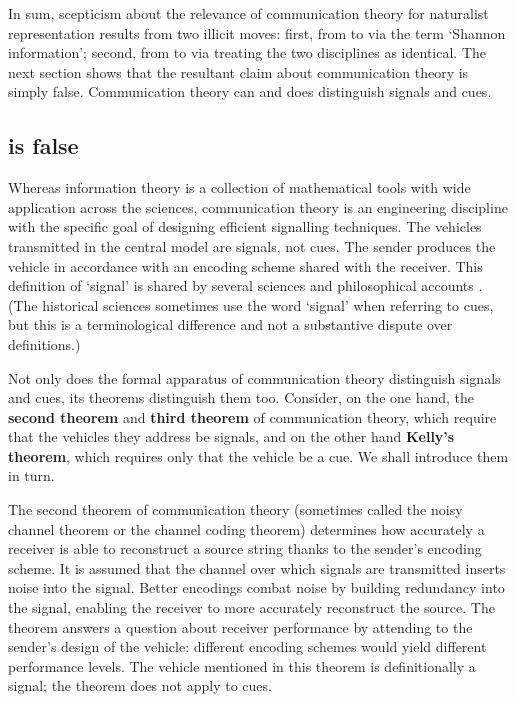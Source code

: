 In sum, scepticism about the relevance of communication theory for naturalist representation results from two illicit moves: first, from \ami{} to \ait{} via the term `Shannon information'; second, from \ait{} to \act{} via treating the two disciplines as identical.
The next section shows that the resultant claim about communication theory is simply false.
Communication theory can and does distinguish signals and cues.


\subsection{\act{} is false}

Whereas information theory is a collection of mathematical tools with wide application across the sciences, communication theory is an engineering discipline with the specific goal of designing efficient signalling techniques.
The vehicles transmitted in the central model are signals, not cues.
The sender produces the vehicle in accordance with an encoding scheme shared with the receiver.
This definition of `signal' is shared by several sciences \citep{shannon1948mathematicalc,maynardsmith2003animal} and philosophical accounts \citep[$\S$6]{millikan2004varieties} \citep{bergstrom2011transmission}.
(The historical sciences sometimes use the word `signal' when referring to cues, but this is a terminological difference and not a substantive dispute over definitions.)

Not only does the formal apparatus of communication theory distinguish signals and cues, its theorems distinguish them too.
Consider, on the one hand, the \textbf{second theorem} and \textbf{third theorem} of communication theory, which require that the vehicles they address be signals, and on the other hand \textbf{Kelly's theorem}, which requires only that the vehicle be a cue.
We shall introduce them in turn.

The second theorem of communication theory (sometimes called the noisy channel theorem or the channel coding theorem) determines how accurately a receiver is able to reconstruct a source string thanks to the sender's encoding scheme.
It is assumed that the channel over which signals are transmitted inserts noise into the signal.
Better encodings combat noise by building redundancy into the signal, enabling the receiver to more accurately reconstruct the source.
The theorem answers a question about receiver performance by attending to the sender's design of the vehicle: different encoding schemes would yield different performance levels.
The vehicle mentioned in this theorem is definitionally a signal; the theorem does not apply to cues.

